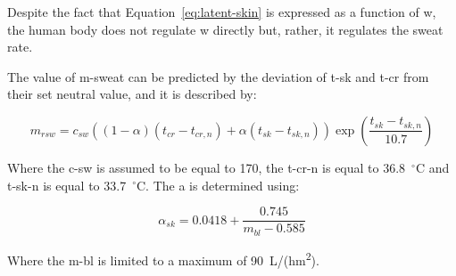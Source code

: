 Despite the fact that Equation~\ref{eq:latent-skin} is expressed as a function of \ac{w}, the human body does not regulate \ac{w} directly but, rather, it regulates the sweat rate.

The value of \ac{m-sweat} can be predicted by the deviation of \ac{t-sk} and \ac{t-cr} from their set neutral value, and it is described by:


\begin{equation}
    m_{rsw}=c_{sw}((1 - \alpha) (t_{cr} - t_{cr,n}) + \alpha (t_{sk} - t_{sk,n})) \exp (\frac{t_{sk}-t_{sk,n}}{10.7})\label{eq:regulatory-sweating}
\end{equation}

Where the \ac{c-sw} is assumed to be equal to 170, the \ac{t-cr-n} is equal to 36.8~$^{\circ}$C and \ac{t-sk-n} is equal to 33.7~$^{\circ}$C\@.
The \ac{a} is determined using:

\begin{equation}
    \alpha_{sk}=0.0418+\frac{0.745}{m_{b l}-0.585}\label{eq:alpha}
\end{equation}

Where the \ac{m-bl} is limited to a maximum of 90~L/(hm\textsuperscript{2}).



